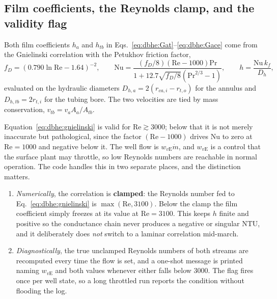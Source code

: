 \subsection{Film coefficients, the Reynolds clamp, and the validity flag}
\label{sec:dbhe:reynolds}

Both film coefficients $h_a$ and $h_{tb}$ in
Eqs.~\eqref{eq:dbhe:Gat}--\eqref{eq:dbhe:Gace} come from the Gnielinski
correlation with the Petukhov friction factor,
\begin{equation}
f_D=\left(0.790\ln\mathrm{Re}-1.64\right)^{-2}, \qquad
\mathrm{Nu}=\frac{(f_D/8)\left(\mathrm{Re}-1000\right)\mathrm{Pr}}
{1+12.7\sqrt{f_D/8}\left(\mathrm{Pr}^{2/3}-1\right)}, \qquad h=\frac{\mathrm{Nu}\,k_f}{D_h},
\label{eq:dbhe:gnielinski}
\end{equation}
evaluated on the hydraulic diameters $D_{h,a}=2(r_{ca,i}-r_{t,o})$ for the
annulus and $D_{h,tb}=2r_{t,i}$ for the tubing bore. The two velocities are tied
by mass conservation, $v_{tb}=v_a A_a/A_{tb}$.

Equation~\eqref{eq:dbhe:gnielinski} is valid for $\mathrm{Re}\gtrsim3000$; below
that it is not merely inaccurate but pathological, since the factor
$(\mathrm{Re}-1000)$ drives $\mathrm{Nu}$ to zero at $\mathrm{Re}=1000$ and
negative below it. The well flow is $w_{v\mathrm{E}}\dot m$, and
$w_{v\mathrm{E}}$ is a control that the surface plant may throttle, so low
Reynolds numbers are reachable in normal operation. The code handles this in two
separate places, and the distinction matters.

\begin{enumerate}[leftmargin=*]
\item \emph{Numerically}, the correlation is \textbf{clamped}: the Reynolds
number fed to Eq.~\eqref{eq:dbhe:gnielinski} is $\max(\mathrm{Re},3100)$. Below
the clamp the film coefficient simply freezes at its value at
$\mathrm{Re}=3100$. This keeps $h$ finite and positive so the conductance chain
never produces a negative or singular $\mathrm{NTU}$, and it deliberately does
\emph{not} switch to a laminar correlation mid-march.
\item \emph{Diagnostically}, the true unclamped Reynolds numbers of both streams
are recomputed every time the flow is set, and a one-shot message is printed
naming $w_{v\mathrm{E}}$ and both values whenever either falls below $3000$. The
flag fires once per well state, so a long throttled run reports the condition
without flooding the log.
\end{enumerate}

